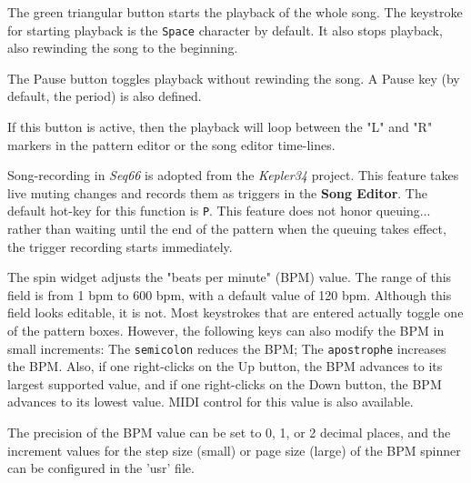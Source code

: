    The green triangular button starts the playback of the whole song.
   The keystroke for starting playback is the \texttt{Space} character by
   default.  It also stops playback, also rewinding the song to the beginning.

   The Pause button toggles playback without rewinding the song.
   A Pause key (by default, the period) is also defined.

   If this button is active, then the playback will loop
   between the "L" and "R" markers in the pattern editor or the song editor
   time-lines.

   Song-recording in \textsl{Seq66} is adopted from the
   \textsl{Kepler34} project.
   This feature takes live muting changes and records them as
   triggers in the \textbf{Song Editor}.
   The default hot-key for this function is \texttt{P}.
   This feature does not honor queuing...
   rather than waiting until the end of the pattern when the queuing takes
   effect, the trigger recording starts immediately.


   The spin widget adjusts the "beats per minute" (BPM) value.  The
   range of this field is from 1 bpm to 600 bpm, with a default value of
   120 bpm.
   Although this field looks editable, it is not.  Most keystrokes
   that are entered actually toggle one of the pattern boxes.
   However, the following keys can also modify the BPM in small increments:
   The \texttt{semicolon} reduces the BPM;
   The \texttt{apostrophe} increases the BPM.
   Also, if one right-clicks on the Up button, the BPM advances to its largest
   supported value, and if one right-clicks on the Down button, the BPM
   advances to its lowest value.
   MIDI control for this value is also available.

   The precision of the BPM value can be set to 0, 1, or 2
   decimal places, and the increment values for the step size (small)
   or page size (large) of the BPM spinner can be configured in the 'usr' file.

